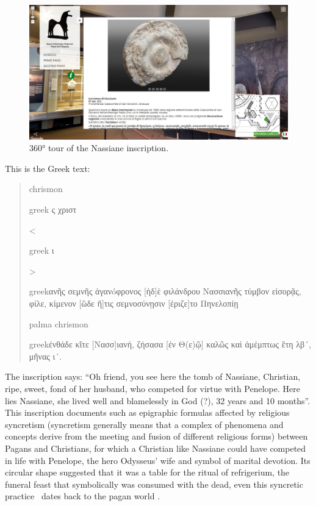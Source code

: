\documentclass[amsthm,ebook]{saparticle}
\begin{document}
\begin{figure}[!bp]
\centering
 \includegraphics[width=\columnwidth]{EAGLE2016BONACINIPilotprojectatPaoloOrsiMuseum-img005.jpg}
\caption{360° tour of the Nassiane inscription.}
\label{fig:5}
\end{figure}


This is the Greek text: 

\begin{quotation}

chrismon \begin{otherlanguage*}{greek} ς χριστ\end{otherlanguage*}<\begin{otherlanguage*}{greek} ι\end{otherlanguage*}>\begin{otherlanguage*}{greek}ανῆς σεμνῆς ἀγανóφρονος [ἠδ]ὲ φιλάνδρου Nασσιανῆς τύμβον εἰσορᾷς, φίλε, κίμενον [ὣδε ἥ]τις σεμνοσύνῃσιν [ἐριζε]το Πηνελοπίῃ\end{otherlanguage*} palma chrismon \begin{otherlanguage*}{greek}ἐνθάδε κῖτε [Nασσ]ιανή, ζήσασα [ἐν Θ(ε)ῷ] καλῶς καὶ ἀμέμπτως ἒτη λβ´, μῆνας ι´.
\end{otherlanguage*}

\end{quotation}



The inscription says: ``Oh friend, you see here the tomb of Nassiane, Christian, ripe, sweet, fond of her husband, who
competed for virtue with Penelope. Here lies Nassiane, she lived well and blamelessly in God (?), 32 years and 10
months''. This inscription documents such as epigraphic formulas affected by religious syncretism (syncretism generally
means that a complex of phenomena and concepts derive from the meeting and fusion of different religious forms) between
Pagans and Christians, for which a Christian like Nassiane could have competed in life with Penelope, the hero
Odysseus’ wife and symbol of marital devotion. Its circular shape suggested that it was a table for the ritual of
refrigerium, the funeral feast that symbolically was consumed with the dead, even this syncretic practice \ dates back
to the pagan world \citep{Sgarlata2013, Scandurra2014}.
\end{document}
